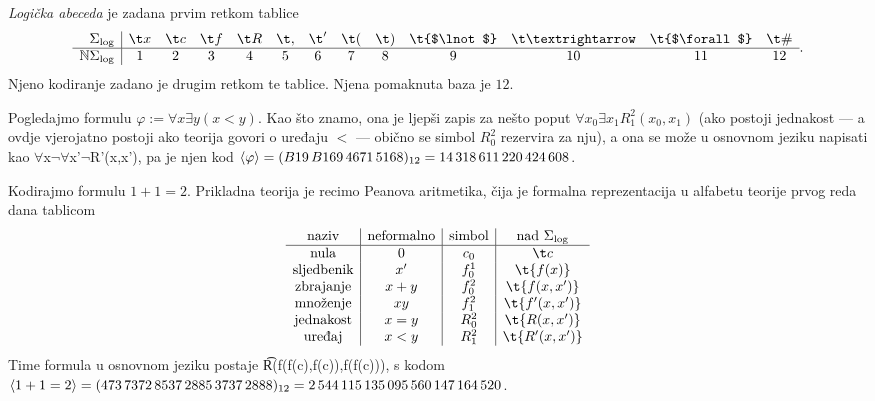 \begin{definicija}[{name=[logička abeceda i njeno kodiranje]}]
\emph{Logička abeceda} je zadana prvim retkom tablice
\begin{equation}
    \begin{array}{r|cccccccccccc}
        \Sigma_{\log}& \t x & \t c & \t f & \t R & \t, & \t' & \t( & \t) & \t{$\lnot$} & \t\textrightarrow & \t{$\forall$} & \t\# \\\hline
         \N\Sigma_{\log}& 1 & 2 & 3 & 4 & 5 & 6 & 7 & 8 & 9 & 10 & 11 & 12
    \end{array}\text.
\end{equation}
Njeno kodiranje zadano je drugim retkom te tablice. Njena pomaknuta baza je $12$. \end{definicija}

\begin{primjer}[{name=[kodiranje formule "ne postoji najveći element"]}]
Pogledajmo formulu $\varphi:=\forall x\exists y(x<y)$. Kao što znamo, ona je ljepši zapis za nešto poput $\forall x_0\exists x_1 R_1^2(x_0,x_1)$ (ako postoji jednakost --- a ovdje vjerojatno postoji ako teorija govori o uređaju $<$ --- obično se simbol $R_0^2$ rezervira za nju), a ona se može u osnovnom jeziku napisati kao \t{$\forall$x$\lnot\forall$x'$\lnot$R'(x,x')}, pa je njen kod $\langle\varphi\rangle=(B19\,B169\,4671\,5168)_{12}=14\,318\,611\,220\,424\,608$.
\end{primjer}

\begin{primjer}[{name=[kodiranje jednostavne aritmetičke formule]}]
Kodirajmo formulu $1+1=2$. Prikladna teorija je recimo Peanova aritmetika, čija je formalna reprezentacija u alfabetu teorije prvog reda dana tablicom
\begin{equation}
    \begin{array}{c|c|c|c}
        \text{naziv}&\text{neformalno}&\text{simbol}&\text{nad }\Sigma_{\log}\\\hline
        \text{nula} & 0 & c_0 & \t c\\
        \text{sljedbenik} & x' & f_0^1 & \t{f(x)} \\
        \text{zbrajanje} & x+y & f_0^2 & \t{f(x,x')}\\
        \text{množenje} & xy & f_1^2 & \t{f'(x,x')}\\
        \text{jednakost} & x=y & R_0^2 & \t{R(x,x')}\\
        \text{uređaj} & x<y & R_1^2 & \t{R'(x,x')}
    \end{array}
\end{equation}
Time formula u osnovnom jeziku postaje \t{R(f(f(c),f(c)),f(f(c)))}, s kodom\\ $\langle1+1=2\rangle=(473\,7372\,8537\,2885\,3737\,2888)_{12}=2\,544\,115\,135\,095\,560\,147\,164\,520$.
\end{primjer}

